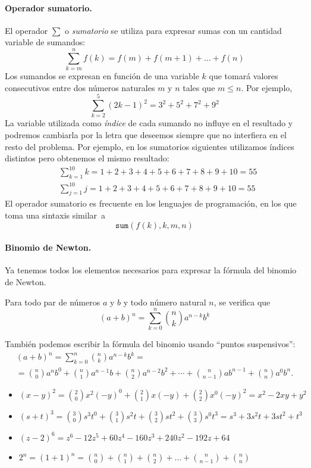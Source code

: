 \paragraph{Operador sumatorio.} El operador $\displaystyle\sum$ o \emph{sumatorio} se utiliza para expresar sumas con un cantidad variable de sumandos:
\[
\sum_{k=m}^n f(k) = f(m)+f(m+1)+\dots+f(n)
\]
Los sumandos se expresan en función de una variable $k$ que tomará valores consecutivos entre dos números naturales $m$ y $n$ tales que $m\le n$.
Por ejemplo,
\[
\sum_{k=2}^5 (2k-1)^2 = 3^2+5^2+7^2+9^2
\]
La variable utilizada como \emph{índice} de cada sumando no influye en el resultado y podremos cambiarla por la letra que deseemos siempre que no interfiera en el resto del problema.
Por ejemplo, en los sumatorios siguientes utilizamos índices distintos pero obtenemos el mismo resultado:
\begin{align*}
& \sum_{k=1}^{10}k=1+2+3+4+5+6+7+8+9+10=55\\
& \sum_{j=1}^{10}j=1+2+3+4+5+6+7+8+9+10=55
\end{align*}
%
El operador sumatorio es frecuente en los lenguajes de programación, en los que toma una sintaxis similar~a
\[
\mathtt{sum}(f(k),k,m,n)
\]

\paragraph{Binomio de Newton.}
Ya tenemos todos los elementos necesarios para expresar la fórmula del binomio de Newton.
%
\begin{teorema}\label{th:newton}
Para todo par de números $a$ y $b$ y todo número natural $n$, se verifica que 
\[
(a+b)^n = \sum_{k=0}^n \binom{n}{k} a^{n-k} b^k
\]
\end{teorema}
%
También podemos escribir la fórmula del binomio usando ``puntos suspensivos'':
\begin{multline*}
(a+b)^n = \sum_{k=0}^n \binom{n}{k} a^{n-k} b^k=\\
= \binom{n}{0}a^n b^0 + \binom{n}{1}a^{n-1} b + \binom{n}{2}a^{n-2} b^2 + \cdots +
\binom{n}{n-1} a b^{n-1} + \binom{n}{n} a^0 b^n.
\end{multline*}
%
\begin{ejemplo-br}
\begin{itemize}
\item $ (x-y)^2 = \binom{2}{0} x^2 (-y)^0 + \binom{2}{1} x (-y) + \binom{2}{2} x^0 (-y)^2
= x^2 - 2xy + y^2 $
\item $ (s+t)^3 = \binom{3}{0} s^3 t^0 + \binom{3}{1} s^2 t + \binom{3}{2} s
t^2 + \binom{3}{3} s^0 t^3 = s^3 + 3s^2t + 3st^2+ t^3 $
\item $ (z-2)^6 = z^6 - 12z^5 + 60z^4 - 160z^3 + 240z^2 - 192z + 64 $
\item
$2^n=(1+1)^n=\binom{n}{0} + \binom{n}{1} + \binom{n}{2}+ \ldots +
\binom{n}{n-1} + \binom{n}{n}$\fej
\end{itemize}
\end{ejemplo-br}

